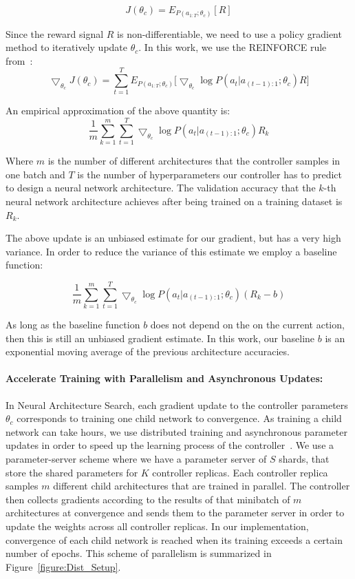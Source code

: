 \documentclass{article} \usepackage{iclr2017_conference,times}
\begin{document}
$$J(\theta_c) = E_{P(a_{1:T};\theta_c)}[R] $$

Since the reward signal $R$ is non-differentiable, we need to use a policy gradient method to iteratively update $\theta_c$. In this work, we use the REINFORCE rule from~\cite{Williams92simplestatistical}: 
$$ \bigtriangledown_{\theta_c} J(\theta_c) = \sum_{t=1}^{T} E_{P(a_{1:T};\theta_c)}\big[\bigtriangledown_{\theta_c} \log P(a_t|a_{(t-1):1};\theta_c)R\big] $$

An empirical approximation of the above quantity is:
$$ \frac{1}{m} \sum_{k=1}^{m} \sum_{t=1}^{T} \bigtriangledown_{\theta_c} \log P(a_t|a_{(t-1):1};\theta_c)R_{k} $$

Where $m$ is the number of different architectures that the controller samples in one batch and $T$ is the number of hyperparameters our controller has to predict to design a neural network architecture. The validation accuracy that the $k$-th neural network architecture achieves after being trained on a training dataset is $R_k$.

The above update is an unbiased estimate for our gradient, but has a very high variance. In order to reduce the variance of this estimate we employ a baseline function:

$$ \frac{1}{m} \sum_{k=1}^{m} \sum_{t=1}^{T} \bigtriangledown_{\theta_c} \log P(a_t|a_{(t-1):1};\theta_c)(R_{k} - b) $$

As long as the baseline function $b$ does not depend on the on the current action, then this is still an unbiased gradient estimate. In this work, our baseline $b$ is an exponential moving average of the previous architecture accuracies.








\paragraph{Accelerate Training with Parallelism and Asynchronous Updates:} In Neural Architecture Search, each gradient update to the controller parameters $\theta_c$ corresponds to training one child network to convergence. As training a child network can take hours, we use distributed training and asynchronous parameter updates in order to speed up the learning process of the controller~\citep{dean2012large}. We use a parameter-server scheme where we have a parameter server of $S$ shards, that store the shared parameters for $K$ controller replicas. Each controller replica samples $m$ different child architectures that are trained in parallel. The controller then collects gradients according to the results of that minibatch of $m$ architectures at convergence and sends them to the parameter server in order to update the weights across all controller replicas. In our implementation, convergence of each child network is reached when its training exceeds a certain number of epochs. This scheme of parallelism is summarized in Figure~\ref{figure:Dist_Setup}.
\end{document}
